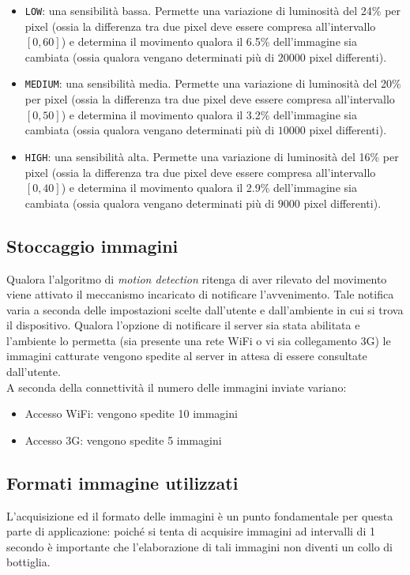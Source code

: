 \begin{itemize}
  \item \texttt{LOW}: una sensibilità bassa. Permette una variazione di luminosità del 24\% per pixel (ossia la differenza tra due pixel deve essere compresa all'intervallo $[0,60]$) e determina il movimento qualora il 6.5\% dell'immagine sia cambiata (ossia qualora vengano determinati più di $20000$ pixel differenti).
  \item \texttt{MEDIUM}: una sensibilità media. Permette una variazione di luminosità del 20\% per pixel (ossia la differenza tra due pixel deve essere compresa all'intervallo $[0,50]$) e determina il movimento qualora il 3.2\% dell'immagine sia cambiata (ossia qualora vengano determinati più di $10000$ pixel differenti).
  \item \texttt{HIGH}: una sensibilità alta. Permette una variazione di luminosità del 16\% per pixel (ossia la differenza tra due pixel deve essere compresa all'intervallo $[0,40]$) e determina il movimento qualora il 2.9\% dell'immagine sia cambiata (ossia qualora vengano determinati più di $9000$ pixel differenti).
\end{itemize}

\subsection{Stoccaggio immagini}
Qualora l'algoritmo di \textit{motion detection} ritenga di aver rilevato del movimento viene attivato il meccanismo incaricato di notificare l'avvenimento. Tale notifica varia a seconda delle impostazioni scelte dall'utente e dall'ambiente in cui si trova il dispositivo. Qualora l'opzione di notificare il server sia stata abilitata e l'ambiente lo permetta (sia presente una rete WiFi o vi sia collegamento 3G) le immagini catturate vengono spedite al server in attesa di essere consultate dall'utente.\\
A seconda della connettività il numero delle immagini inviate variano:
\begin{itemize}
  \item Accesso WiFi: vengono spedite 10 immagini
  \item Accesso 3G: vengono spedite 5 immagini
\end{itemize}

\subsection{Formati immagine utilizzati}
L'acquisizione ed il formato delle immagini è un punto fondamentale per questa parte di applicazione: poiché si tenta di acquisire immagini ad intervalli di 1 secondo è importante che l'elaborazione di tali immagini non diventi un collo di bottiglia.\\

